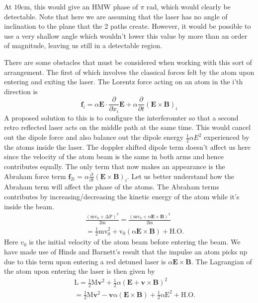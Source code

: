 \documentclass[twocolumn,english,pra,aps,superscriptaddress,floatfix]{revtex4-1}
\begin{document}
At $10$cm, this would give an HMW phase of $\pi$ rad, which would clearly be detectable.  Note that here we are assuming that the laser has no angle of inclination to the plane that the 2 paths create.  However, it would be possible to use a very shallow angle which wouldn't lower this value by more than an order of magnitude, leaving us still in a detectable region.

\vspace{5mm}

There are some obstacles that must be considered when working with this sort of arrangement.  The first of which involves the classical forces felt by the atom upon entering and exiting the laser.  The Lorentz force acting on an atom in the i'th direction is
\begin{equation}
\mathbf{f}_i= \alpha\mathbf{E}\cdot\frac{\partial}{\partial x_i}\mathbf{E}+\alpha\frac{\partial}{\partial t}\left(\mathbf{E}\times\mathbf{B}\right)_i
\label{lorentz4}
\end{equation}
A proposed solution to this is to configure the interferomter so that a second retro reflected laser acts on the middle path at the same time.  This would cancel out the dipole force and also balance out the dipole energy $\frac{1}{2}\alpha E^2$ experienced by the atoms inside the laser.  
The doppler shifted dipole term doesn't affect us here since the velocity of the atom beam is the same in both arms and hence contributes equally.  The only term that now makes an appearance is the Abraham force term $\mathbf{f}_{2i}= \alpha\frac{\partial}{\partial t}\left(\mathbf{E}\times\mathbf{B}\right)_i$.  Let us better understand how the Abraham term will affect the phase of the atoms.  The Abraham terms contributes by increasing/decreasing the kinetic energy of the atom while it's inside the beam.
\begin{eqnarray}
&&\mathrm{\frac{(mv_0+ \Delta P)^2}{2m}=\frac{(mv_0+\alpha\mathbf{E}\times\mathbf{B})^2}{2m}} \nonumber \\
&&\mathrm{=\frac{1}{2}mv_0^2+v_0(\alpha\mathbf{E}\times\mathbf{B}) +H.O.}
\end{eqnarray}
Here $v_0$ is the initial velocity of the atom beam before entering the beam.  We have made use of Hinds and Barnett's result \cite{hinds} that the impulse an atom picks up due to this term upon entering a red detuned laser is $\alpha\mathbf{E}\times\mathbf{B}$. The Lagrangian of the atom upon entering the laser is then given by
\begin{eqnarray}
&&\mathrm{L}=\frac{1}{2}\mathrm{M}\mathbf{v}^2 + \frac{1}{2}\alpha\left(\mathbf{E} +\mathbf{v}\times\mathbf{B}\right)^2 \nonumber \\
&&=\frac{1}{2}\mathrm{M\mathbf{v}^2 - \mathbf{v}\alpha(\mathbf{E}\times\mathbf{B})+\frac{1}{2}\alpha E^2 +H.O.}
\label{lagrangian3}
\end{eqnarray}
\end{document}
